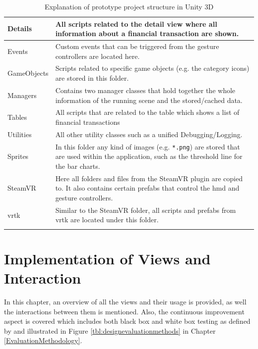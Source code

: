 \begin{longtable}{ | p{3cm} | p{11cm} |}
	\hline
		\textrightarrow{} Details &
		All scripts related to the detail view where all information about a financial transaction are shown. \\
	\hline
		\textrightarrow{} Events &
		Custom events that can be triggered from the gesture controllers are located here. \\
	\hline
		\textrightarrow{} GameObjects &
		Scripts related to specific game objects (e.g. the category icons) are stored in this folder. \\
	\hline
		\textrightarrow{} Managers &
		Contains two manager classes that hold together the whole information of the running scene and the stored/cached data. \\
	\hline
		\textrightarrow{} Tables &
		All scripts that are related to the table which shows a list of financial transactions \\
	\hline
		\textrightarrow{} Utilities &
		All other utility classes such as a unified Debugging/Logging. \\
	\hline
		Sprites &
		In this folder any kind of images (e.g. \texttt{*.png}) are stored that are used within the application, such as the threshold line for the bar charts. \\
	\hline
		SteamVR &
		Here all folders and files from the SteamVR plugin are copied to. It also contains certain prefabs that control the \gls{hmd} and gesture controllers. \\
	\hline
		\gls{vrtk} &
		Similar to the SteamVR folder, all scripts and prefabs from \gls{vrtk} are located under this folder. \\
	\hline
	\caption{Explanation of prototype project structure in Unity 3D}
	\label{tbl:codestructuredesc}
\end{longtable}



\section{Implementation of Views and Interaction}

In this chapter, an overview of all the views and their usage is provided, as well the interactions between them is mentioned. Also, the continuous improvement aspect is covered which includes both black box and white box testing as defined by \cite{Hevner2004} and illustrated in Figure \ref{tbl:designevaluationmethods} in Chapter \ref{EvaluationMethodology}.

